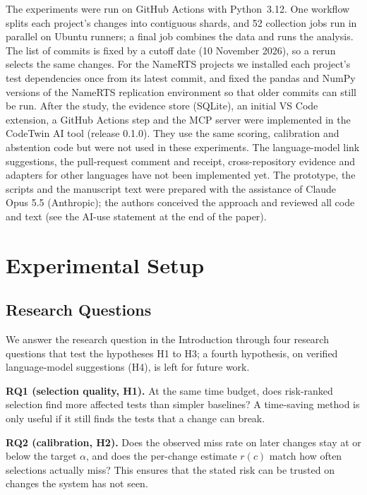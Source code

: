 \documentclass[conference]{IEEEtran}
\begin{document}
The experiments were run on GitHub Actions with Python~3.12. One workflow splits each project's changes into contiguous shards, and 52 collection jobs run in parallel on Ubuntu runners; a final job combines the data and runs the analysis. The list of commits is fixed by a cutoff date (10 November 2026), so a rerun selects the same changes. For the NameRTS projects we installed each project's test dependencies once from its latest commit, and fixed the pandas and NumPy versions of the NameRTS replication environment so that older commits can still be run. After the study, the evidence store (SQLite), an initial VS Code extension, a GitHub Actions step and the MCP server were implemented in the CodeTwin AI tool (release 0.1.0). They use the same scoring, calibration and abstention code but were not used in these experiments. The language-model link suggestions, the pull-request comment and receipt, cross-repository evidence and adapters for other languages have not been implemented yet. The prototype, the scripts and the manuscript text were prepared with the assistance of Claude Opus 5.5 (Anthropic); the authors conceived the approach and reviewed all code and text (see the AI-use statement at the end of the paper).

\section{Experimental Setup}\label{sec:setup}
\subsection{Research Questions}
We answer the research question in the Introduction through four research questions that test the hypotheses H1 to H3; a fourth hypothesis, on verified language-model suggestions (H4), is left for future work.

\textbf{RQ1 (selection quality, H1).} At the same time budget, does risk-ranked selection find more affected tests than simpler baselines? A time-saving method is only useful if it still finds the tests that a change can break.

\textbf{RQ2 (calibration, H2).} Does the observed miss rate on later changes stay at or below the target $\alpha$, and does the per-change estimate $r(c)$ match how often selections actually miss? This ensures that the stated risk can be trusted on changes the system has not seen.
\end{document}
